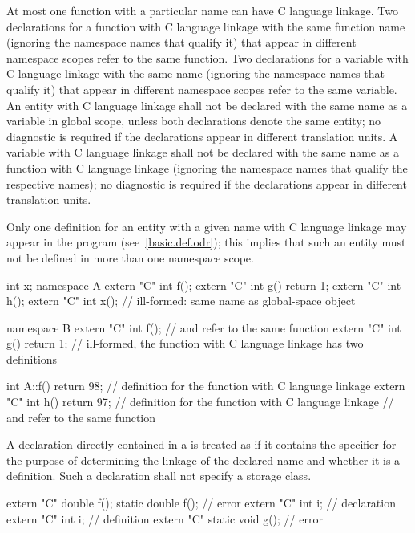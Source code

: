 \pnum
{}%
At most one function with a particular name can have C language linkage.
Two declarations for a function with C language linkage with the same
function name (ignoring the namespace names that qualify it) that appear
in different namespace scopes refer to the same function. Two
declarations for a variable with C language linkage with the same name
(ignoring the namespace names that qualify it) that appear in different
namespace scopes refer to the same variable.
An entity with C language linkage shall not be declared with the same name
as a variable in global scope, unless both declarations denote the same entity;
no diagnostic is required if the declarations appear in different translation units.
A variable with C language linkage shall not be declared with the same name as a
function with C language linkage (ignoring the namespace names that qualify the
respective names); no diagnostic is required if the declarations appear in
different translation units.
\begin{note}
Only
one definition for an entity with a given name
with C language linkage may appear in the
program (see~\ref{basic.def.odr});
this implies that such an entity
must not be defined in more
than one namespace scope.
\end{note}
\begin{example}
\begin{codeblock}
int x;
namespace A {
  extern "C" int f();
  extern "C" int g() { return 1; }
  extern "C" int h();
  extern "C" int x();               // ill-formed: same name as global-space object 
}

namespace B {
  extern "C" int f();               //  and  refer to the same function
  extern "C" int g() { return 1; }  // ill-formed, the function  with C language linkage has two definitions
}

int A::f() { return 98; }           // definition for the function  with C language linkage
extern "C" int h() { return 97; }   // definition for the function  with C language linkage
                                    //  and  refer to the same function
\end{codeblock}
\end{example}

\pnum
A declaration directly contained in a
is treated as if it contains the
specifier for the purpose of determining the linkage of the
declared name and whether it is a definition. Such a declaration shall
not specify a storage class.
\begin{example}
\begin{codeblock}
extern "C" double f();
static double f();                  // error
extern "C" int i;                   // declaration
extern "C" {
  int i;                            // definition
}
extern "C" static void g();         // error
\end{codeblock}
\end{example}

